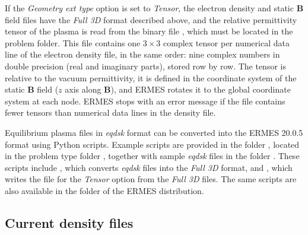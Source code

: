 If the \emph{Geometry ext type} option is set to \textit{Tensor}, the electron density and static \textbf{B} field files have the \textit{Full 3D} format described above, and the relative permittivity tensor of the plasma is read from the binary file , which must be located in the problem folder. This file contains one $3\times3$ complex tensor per numerical data line of the electron density file, in the same order: nine complex numbers in double precision (real and imaginary parts), stored row by row. The tensor is relative to the vacuum permittivity, it is defined in the coordinate system of the static \textbf{B} field ($z$ axis along \textbf{B}), and ERMES rotates it to the global coordinate system at each node. ERMES stops with an error message if the file contains fewer tensors than numerical data lines in the density file.

Equilibrium plasma files in \textit{eqdsk} format can be converted into the ERMES 20.0.5 format using Python scripts. Example scripts are provided in the folder , located in the problem type folder , together with sample \textit{eqdsk} files in the folder . These scripts include , which converts \textit{eqdsk} files into the \textit{Full 3D} format, and , which writes the file  for the \textit{Tensor} option from the \textit{Full 3D} files. The same scripts are also available in the folder  of the ERMES distribution.

\subsection{Current density files}

